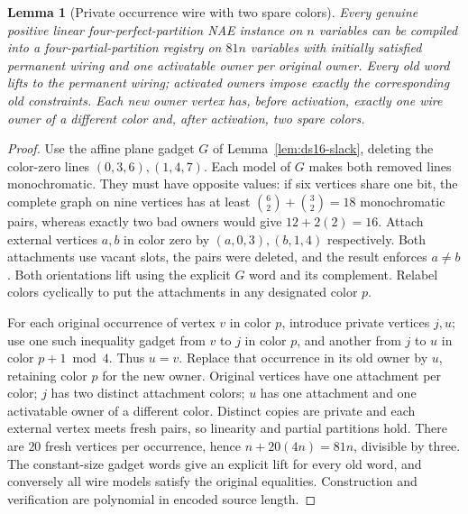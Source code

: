 \documentclass[11pt]{article}
\newtheorem{lemma}[theorem]{Lemma}
\begin{document}
\begin{lemma}[Private occurrence wire with two spare colors]\label{lem:i23-wire}
Every genuine positive linear four-perfect-partition NAE instance on $n$ variables can be compiled into a four-partial-partition registry on $81n$ variables with initially satisfied permanent wiring and one activatable owner per original owner. Every old word lifts to the permanent wiring; activated owners impose exactly the corresponding old constraints. Each new owner vertex has, before activation, exactly one wire owner of a different color and, after activation, two spare colors.
\end{lemma}
\begin{proof}
Use the affine plane gadget $G$ of Lemma~\ref{lem:ds16-slack}, deleting the color-zero lines $(0,3,6),(1,4,7)$. Each model of $G$ makes both removed lines monochromatic. They must have opposite values: if six vertices share one bit, the complete graph on nine vertices has at least $\binom62+\binom32=18$ monochromatic pairs, whereas exactly two bad owners would give $12+2(2)=16$. Attach external vertices $a,b$ in color zero by $(a,0,3),(b,1,4)$ respectively. Both attachments use vacant slots, the pairs were deleted, and the result enforces $a\ne b$. Both orientations lift using the explicit $G$ word and its complement. Relabel colors cyclically to put the attachments in any designated color $p$. 

For each original occurrence of vertex $v$ in color $p$, introduce private vertices $j,u$; use one such inequality gadget from $v$ to $j$ in color $p$, and another from $j$ to $u$ in color $p+1\bmod4$. Thus $u=v$. Replace that occurrence in its old owner by $u$, retaining color $p$ for the new owner. Original vertices have one attachment per color; $j$ has two distinct attachment colors; $u$ has one attachment and one activatable owner of a different color. Distinct copies are private and each external vertex meets fresh pairs, so linearity and partial partitions hold. There are $20$ fresh vertices per occurrence, hence $n+20(4n)=81n$, divisible by three. The constant-size gadget words give an explicit lift for every old word, and conversely all wire models satisfy the original equalities. Construction and verification are polynomial in encoded source length.
\end{proof}
\end{document}
